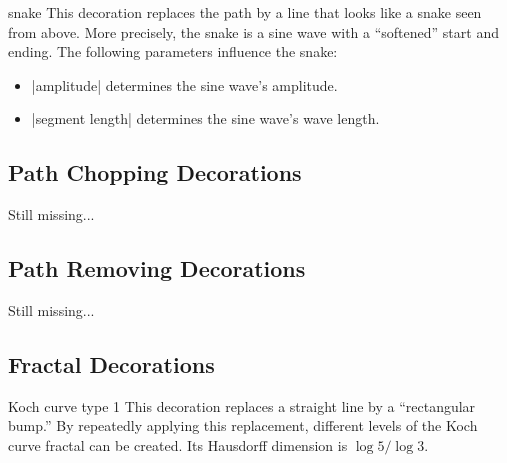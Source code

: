 \begin{decoration}{snake}
  This decoration replaces the path by a line that looks like a snake
  seen from above. More precisely, the snake is a sine wave with a
  ``softened'' start and ending. The following parameters influence
  the snake: 
  \begin{itemize}
  \item |amplitude|
    determines the sine wave's amplitude.
  \item |segment length|
    determines the sine wave's wave length.
  \end{itemize}
\begin{codeexample}[]
\end{codeexample}
\end{decoration}



  
\subsection{Path Chopping Decorations}

Still missing...

\subsection{Path Removing Decorations}

Still missing...

\subsection{Fractal Decorations}

\begin{decoration}{Koch curve type 1}
  This decoration replaces a straight line by a ``rectangular bump.''
  By repeatedly applying this replacement, different levels of the
  Koch curve fractal can be created. Its Hausdorff dimension is $\log
  5/\log 3$.
\begin{codeexample}[]
\end{codeexample}
\end{decoration}


